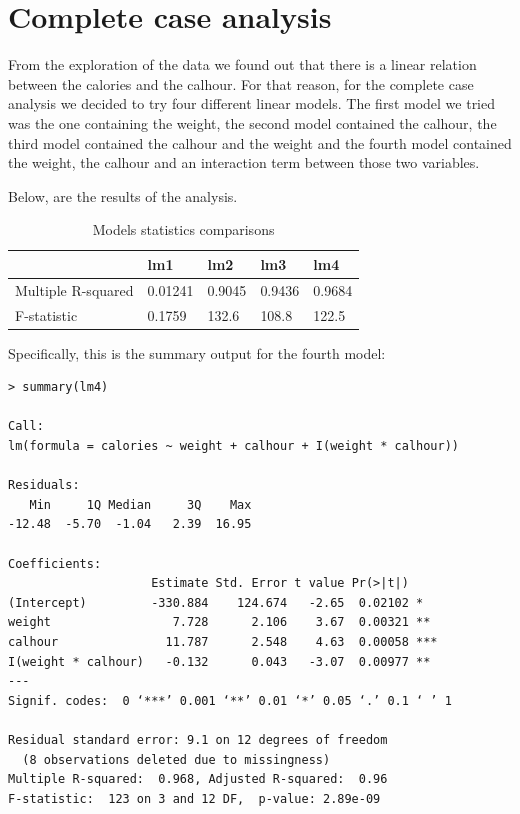 \documentclass[11pt, a4paper]{article}
\begin{document}
\section{Complete case analysis}

From the exploration of the data we found out that there is a linear
relation between the calories and the calhour. For that reason, for
the complete case analysis we decided to try four different linear
models. The first model we tried was the one containing the weight,
the second model contained the calhour, the third model contained the
calhour and the weight and the fourth model contained the weight, the
calhour and an interaction term between those two variables.

Below, are the results of the analysis.

\begin{table}[H]
    \centering
    \begin{tabular}{l|l|l|l|l|}
    \cline{2-5}
                                         & lm1     & lm2    & lm3    & lm4    \\ \hline
    \multicolumn{1}{|l|}{Multiple R-squared} & 0.01241 & 0.9045 & 0.9436 & 0.9684 \\ \hline
    \multicolumn{1}{|l|}{F-statistic}        & 0.1759  & 132.6  & 108.8  & 122.5  \\ \hline
    \end{tabular}
    \caption{Models statistics comparisons}
\end{table}

Specifically, this is the summary output for the fourth model:

\begin{verbatim}
> summary(lm4)

Call:
lm(formula = calories ~ weight + calhour + I(weight * calhour))

Residuals:
   Min     1Q Median     3Q    Max 
-12.48  -5.70  -1.04   2.39  16.95 

Coefficients:
                    Estimate Std. Error t value Pr(>|t|)    
(Intercept)         -330.884    124.674   -2.65  0.02102 *  
weight                 7.728      2.106    3.67  0.00321 ** 
calhour               11.787      2.548    4.63  0.00058 ***
I(weight * calhour)   -0.132      0.043   -3.07  0.00977 ** 
---
Signif. codes:  0 ‘***’ 0.001 ‘**’ 0.01 ‘*’ 0.05 ‘.’ 0.1 ‘ ’ 1

Residual standard error: 9.1 on 12 degrees of freedom
  (8 observations deleted due to missingness)
Multiple R-squared:  0.968,	Adjusted R-squared:  0.96 
F-statistic:  123 on 3 and 12 DF,  p-value: 2.89e-09
\end{verbatim}
\end{document}
